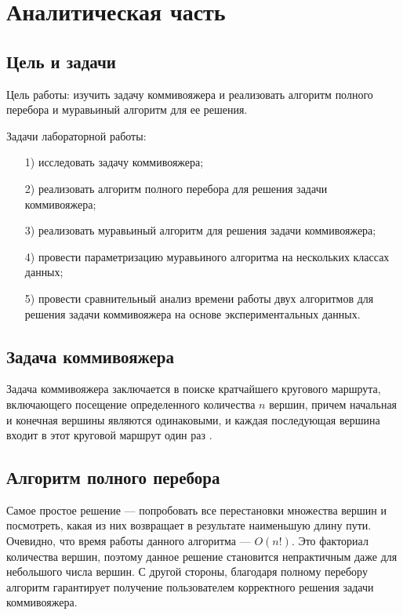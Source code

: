 \chapter{Аналитическая часть}

\section{Цель и задачи}

Цель работы: изучить задачу коммивояжера и реализовать алгоритм полного перебора и муравьиный алгоритм для ее решения.

Задачи лабораторной работы:
\begin{enumerate}
\item[1)] исследовать задачу коммивояжера;
\item[2)] реализовать алгоритм полного перебора для решения задачи коммивояжера;
\item[3)] реализовать муравьиный алгоритм для решения задачи коммивояжера;
\item[4)] провести параметризацию муравьиного алгоритма на нескольких классах данных;
\item[5)] провести сравнительный анализ времени работы двух алгоритмов для решения задачи коммивояжера на основе экспериментальных данных.
\end{enumerate}

\section{Задача коммивояжера}

Задача коммивояжера заключается в поиске кратчайшего кругового маршрута, включающего посещение определенного количества $n$ вершин, причем начальная и конечная вершины являются одинаковыми, и каждая последующая вершина входит в этот круговой маршрут один раз \cite{Brezina2020}. 

\section{Алгоритм полного перебора}

Самое простое решение --- попробовать все перестановки множества вершин и посмотреть, какая из них возвращает в результате наименьшую длину пути. 
Очевидно, что время работы данного алгоритма --- $O(n!)$. 
Это факториал количества вершин, поэтому данное решение становится непрактичным даже для небольшого числа вершин. 
С другой стороны, благодаря полному перебору алгоритм гарантирует получение пользователем корректного решения задачи коммивояжера.

